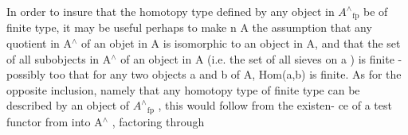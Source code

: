 In order to insure that the homotopy type defined by any object
in $A^{\wedge}{}_{\mathrm{fp}}$ be of finite type, it may be useful perhaps to make n A the
assumption that any quotient in A$^{\wedge}$ of an objet in A is isomorphic to an
object in A, and that the set of all subobjects in A$^{\wedge}$ of an object  in
A (i.e. the set of all sieves on a ) is finite - possibly too that
for any two objects a and b of A, Hom(a,b) is finite. As for the
opposite inclusion, namely that any homotopy type of finite type can
be described by an object of $A^{\wedge}{}_{\mathrm{fp}}$ , this would follow from the existen-%
ce of a \hand{\uline{\textcolor{black}{perfect}}} test functor from \hand{$\Delta$} into A$^{\wedge}$ , factoring through

